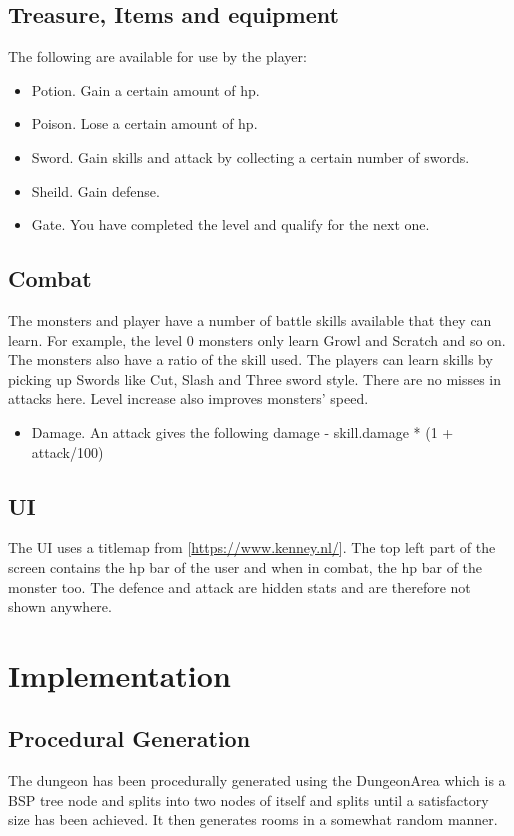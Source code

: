 \documentclass[11pt]{article}
\begin{document}
\subsection{Treasure, Items and equipment}
\label{sec:orgfd61aa9}
The following are available for use by the player:
\begin{itemize}
\item Potion. Gain a certain amount of hp.
\item Poison. Lose a certain amount of hp.
\item Sword. Gain skills and attack by collecting a certain number of swords.
\item Sheild. Gain defense.
\item Gate. You have completed the level and qualify for the next one.
\end{itemize}
\subsection{Combat}
\label{sec:org0d5249b}
The monsters and player have a number of battle skills available that they can learn. For example, the level 0 monsters only learn Growl and Scratch and so on. The monsters also have a ratio of the skill used. The players can learn skills by picking up Swords like Cut, Slash and Three sword style. There are no misses in attacks here. Level increase also improves monsters' speed.
\begin{itemize}
\item Damage. An attack gives the following damage - skill.damage * (1 + attack/100)
\end{itemize}
\subsection{UI}
\label{sec:org6cdc5a5}
The UI uses a titlemap from [\url{https://www.kenney.nl/}]. The top left part of the screen contains the hp bar of the user and when in combat, the hp bar of the monster too. The defence and attack are hidden stats and are therefore not shown anywhere.

\section{Implementation}
\label{sec:orged62c7b}
\subsection{Procedural Generation}
\label{sec:orgbbe5292}
The dungeon has been procedurally generated using the DungeonArea which is a BSP tree node and splits into two nodes of itself and splits until a satisfactory size has been achieved. It then generates rooms in a somewhat random manner.
\end{document}
